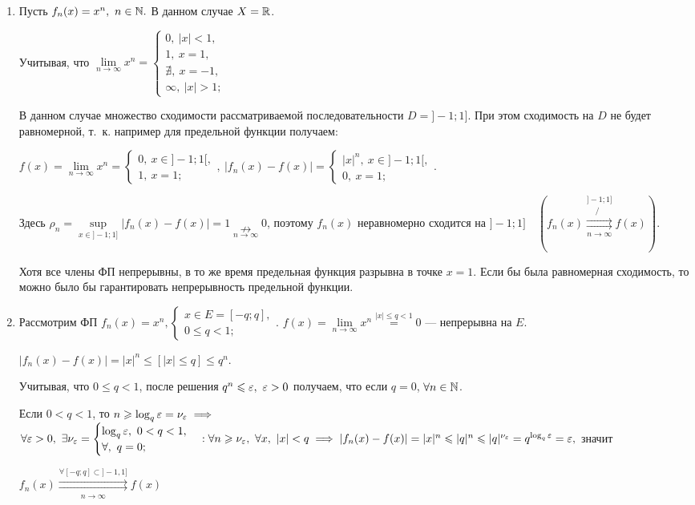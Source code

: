 \documentclass[../../main.tex]{subfiles}
\begin{document}
\begin{exmps}
	\;
	\begin{enumerate}
		\item	 Пусть $f_n(x) = x^n,\ n \in \mathbb{N}.$ 
В данном случае $X = \mathbb{R}$. 

Учитывая, что $\underset{n \to \infty}{\lim} x^n = 
\begin{cases}
0,\ |x| < 1, \\
1,\  x = 1, \\
\nexists,\ x = -1, \\
\infty,\ |x| > 1;
\end{cases}$

В данном случае множество сходимости рассматриваемой 
последовательности $D = ]-1;1]$. 
При этом сходимость на $D$ не будет равномерной, т.~к. 
например для предельной функции получаем:

$f(x) = \underset{n \to \infty}{\lim} x^n = 
\begin{cases}
0,\ x \in ]-1;1[, \\
1,\ x = 1;
\end{cases},\
|f_n(x) - f(x)| = 
\begin{cases}
|x|^n,\ x \in ]-1;1[, \\
0,\ x = 1;
\end{cases}
$.

Здесь $\rho_n = \underset{x \in ]-1;1]}{\sup}|f_n(x)-f(x)| = 1 
\underset{n \to \infty}{\nrightarrow} 0$, поэтому
$f_n(x)$ неравномерно сходится на $]-1;1] \quad
(f_n(x) \overset{]-1;1]}{\underset{n \to \infty}
\not \rightrightarrows} f(x))$. 

Хотя все члены ФП непрерывны, в то же время предельная функция
разрывна в точке $x=1$. Если бы была равномерная сходимость, 
то можно было бы гарантировать непрерывность предельной функции.

		\item Рассмотрим ФП $f_n(x) = x^n,
\begin{cases}
x \in E = [-q;q], \\
0 \leq q < 1;
\end{cases}.
$
$f(x) = \underset{n \to \infty}{\lim} x^n \overset{|x| \leq q < 1}{=} 0$ ---
непрерывна на $E$.

$|f_n(x) - f(x)| = |x|^n \leq \left[|x| \leq q\right] \leq q^n$.

Учитывая, что $0 \leq q < 1$, после решения 
$q^n \leqslant \varepsilon,\ \varepsilon > 0$ получаем,
что если $q = 0$, $\forall n \in \mathbb{N}$. 

Если $0 < q < 1$, то $n \geqslant \log_q\varepsilon = \nu_\varepsilon \implies$
$\forall \eps > 0,\ \exists \nu_\eps = 
\begin{cases}
\log_q \eps,\ 0 < q < 1, \\
\forall,\ q = 0;
\end{cases} : \forall n \geq \nu_\eps,\ \forall x,\ |x| < q \implies 
|f_n(x) - f(x)| = |x|^n \leq |q|^n \leq |q|^{\nu_\eps} = 
q^{\log_q \eps} = \eps,$ значит

$f_n(x) \overset{\forall [-q;q] \subset ]-1,1]}
{\underset{n \to \infty}\rightrightarrows} f(x)$
	\end{enumerate}
\end{exmps}	
\end{document}
